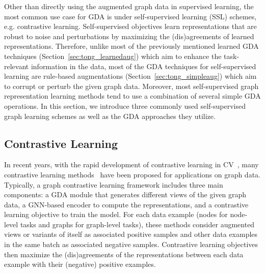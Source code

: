 \documentclass[11pt]{article}
\begin{document}
Other than directly using the augmented graph data in supervised learning, the most common use case for GDA is under self-supervised learning (SSL) schemes, e.g. contrastive learning. Self-supervised objectives learn representations that are robust to noise and perturbations by maximizing the (dis)agreements of learned representations. Therefore, unlike most of the previously mentioned learned GDA techniques (Section~\ref{sec:tong_learnedaug}) which aim to enhance the task-relevant information in the data, most of the GDA techniques for self-supervised learning are rule-based augmentations (Section~\ref{sec:tong_simpleaug}) which aim to corrupt or perturb the given graph data. Moreover, most self-supervised graph representation learning methods tend to use a combination of several simple GDA operations. In this section, we introduce three commonly used self-supervised graph learning schemes as well as the GDA approaches they utilize.

\subsection{Contrastive Learning}
\label{sec:tong_contrastive}
In recent years, with the rapid development of contrastive learning in CV~\cite{chen2020simple}, many  contrastive learning methods~\cite{zhu2020deep,you2020graph,trivedi2021augmentations,xie2022self,liu2022graph,ju2022multi} have been proposed for applications on graph data.
Typically, a graph contrastive learning framework includes three main components: a GDA module that generates different views of the given graph data, a GNN-based encoder to compute the representations, and a contrastive learning objective to train the model. For each data example (nodes for node-level tasks and graphs for graph-level tasks), these methods consider augmented views or variants of itself as associated positive samples and other data examples in the same batch as associated negative samples. Contrastive learning objectives then maximize the (dis)agreements of the representations between each data example with their (negative) positive examples. 
\end{document}
